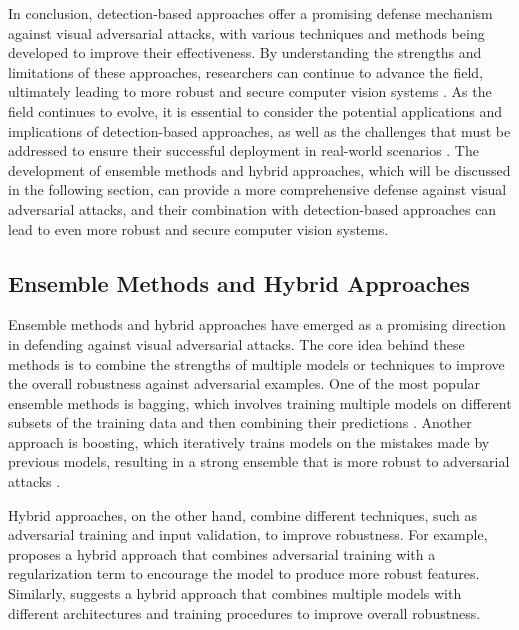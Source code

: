 \documentclass[11pt,a4paper]{article}
\begin{document}
In conclusion, detection-based approaches offer a promising defense mechanism against visual adversarial attacks, with various techniques and methods being developed to improve their effectiveness. By understanding the strengths and limitations of these approaches, researchers can continue to advance the field, ultimately leading to more robust and secure computer vision systems \cite{doi:10.1109/wacv51458.2022.00144,doi:10.1109/ijcnn55064.2022.9892612}. As the field continues to evolve, it is essential to consider the potential applications and implications of detection-based approaches, as well as the challenges that must be addressed to ensure their successful deployment in real-world scenarios \cite{doi:10.1109/eurosp53844.2022.00047}. The development of ensemble methods and hybrid approaches, which will be discussed in the following section, can provide a more comprehensive defense against visual adversarial attacks, and their combination with detection-based approaches can lead to even more robust and secure computer vision systems.


\subsection{Ensemble Methods and Hybrid Approaches}


Ensemble methods and hybrid approaches have emerged as a promising direction in defending against visual adversarial attacks. The core idea behind these methods is to combine the strengths of multiple models or techniques to improve the overall robustness against adversarial examples. One of the most popular ensemble methods is bagging, which involves training multiple models on different subsets of the training data and then combining their predictions \cite{doi:10.1145/3128572.3140444}. Another approach is boosting, which iteratively trains models on the mistakes made by previous models, resulting in a strong ensemble that is more robust to adversarial attacks \cite{arxiv:1705.07204}.

Hybrid approaches, on the other hand, combine different techniques, such as adversarial training and input validation, to improve robustness. For example, \cite{arxiv:1901.08573} proposes a hybrid approach that combines adversarial training with a regularization term to encourage the model to produce more robust features. Similarly, \cite{arxiv:1902.06705} suggests a hybrid approach that combines multiple models with different architectures and training procedures to improve overall robustness.
\end{document}
